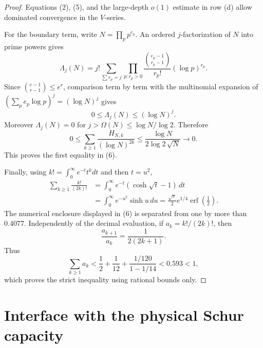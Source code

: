 \documentclass[11pt]{article}
\begin{document}
\begin{proof}
Equations (2), (5), and the large-depth $o(1)$ estimate in row (d) allow
dominated convergence in the $V$-series.

For the boundary term, write $N=\prod_pp^{e_p}$.  An ordered
$j$-factorization of $N$ into prime powers gives
\begin{equation}
 \Lambda_j(N)=j!\!\sum_{\sum r_p=j}
 \prod_{p:r_p>0}
 \frac{\binom{e_p-1}{r_p-1}}{r_p!}(\log p)^{r_p}.              \tag{8}
\end{equation}
Since $\binom{e-1}{r-1}\le e^r$, comparison term by term with the
multinomial expansion of
$(\sum_pe_p\log p)^j=(\log N)^j$ gives
\begin{equation}
                         0\le\Lambda_j(N)\le(\log N)^j.        \tag{9}
\end{equation}
Moreover $\Lambda_j(N)=0$ for $j>\Omega(N)\le\log N/\log2$.  Therefore
\begin{equation}
 0\le\sum_{k\ge1}\frac{H_{N,k}}{(\log N)^{2k}}
 \le\frac{\log N}{2\log2\,\sqrt N}\longrightarrow0.         \tag{10}
\end{equation}
This proves the first equality in (6).

Finally, using $k!=\int_0^\infty e^{-t}t^kdt$ and then $t=u^2$,
\begin{align*}
 \sum_{k\ge1}\frac{k!}{(2k)!}
 &=\int_0^\infty e^{-t}(\cosh\sqrt t-1)\,dt\\
 &=\int_0^\infty e^{-u^2}\sinh u\,du
 =\frac{\sqrt\pi}{2}e^{1/4}\operatorname{erf}\!\left(\frac12\right).
\end{align*}
The numerical enclosure displayed in (6) is separated from one by more
than $0.4077$.  Independently of the decimal evaluation, if
$a_k=k!/(2k)!$, then
\[
 \frac{a_{k+1}}{a_k}=\frac1{2(2k+1)}.
\]
Thus
\[
 \sum_{k\ge1}a_k
 <\frac12+\frac1{12}+\frac{1/120}{1-1/14}<0.593<1,
\]
which proves the strict inequality using rational bounds only.
\end{proof}

\section{Interface with the physical Schur capacity}
\end{document}
